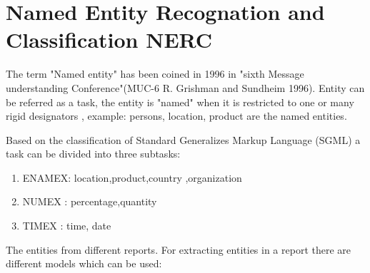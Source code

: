 \section{ Named Entity Recognation and Classification  NERC}
The term "Named entity" has been coined in 1996 in "sixth  Message understanding Conference"(MUC-6  R. Grishman and  Sundheim 1996).
Entity can be referred as a task, the entity is "named" when it is restricted to one or many rigid designators \citep{sharnagat2014named}, example: persons, location, product are the named entities.

Based on the classification of Standard Generalizes Markup Language (SGML) a task can be divided into three subtasks:
\begin{enumerate}
\item ENAMEX: location,product,country ,organization
\item NUMEX : percentage,quantity 
\item TIMEX : time, date
\end{enumerate}


The entities from different reports.
For extracting entities in a report there are different models which can be used:

